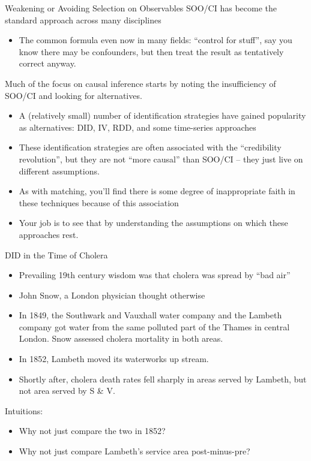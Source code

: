 \documentclass[xcolor=dvipsnames]{beamer}
\begin{document}
\begin{frame}{Weakening or Avoiding Selection on Observables}
 SOO/CI has become the standard approach across many disciplines \\
\footnotesize
\begin{itemize}
\item<2-> The common formula even now in many fields: ``control for stuff'', say you know there may be confounders, but then treat the result as tentatively correct anyway.
\end{itemize}
\normalsize
{}  Much of the focus on causal inference starts by noting the insufficiency of SOO/CI and looking for alternatives. \\
\footnotesize
\begin{itemize}
\item<4-> A (relatively small) number of identification strategies have gained popularity as alternatives: DID, IV, RDD, and some time-series approaches
\item<5-> These identification strategies are often associated with the ``credibility revolution'', but they are not ``more causal'' than SOO/CI -- they just live on different assumptions. 
\item<6-> As with matching, you'll find there is some degree of inappropriate faith in these techniques because of this association
\item<7-> Your job is to see that by understanding the assumptions on which these approaches rest. 
\end{itemize}
\end{frame}

\begin{frame}{DID in the Time of Cholera}
\small
\begin{itemize}
\item Prevailing 19th century wisdom was that cholera was spread by ``bad air''
\smallskip 
\item John Snow, a London physician thought otherwise
\smallskip
\item In 1849, the Southwark and Vauxhall water company and the Lambeth company got water from the same polluted part of the Thames in central London. Snow assessed cholera mortality in both areas. \smallskip
\item In 1852, Lambeth moved its waterworks up stream.
\smallskip
\item Shortly after, cholera death rates fell sharply in areas served by Lambeth, but not area served by S \& V. 
\end{itemize}
\bigskip
{} Intuitions:
\begin{itemize}
\item<3-> Why not just compare the two in 1852?
\item<4-> Why not just compare Lambeth's service area post-minus-pre? 
\end{itemize}
\end{frame}
\end{document}
